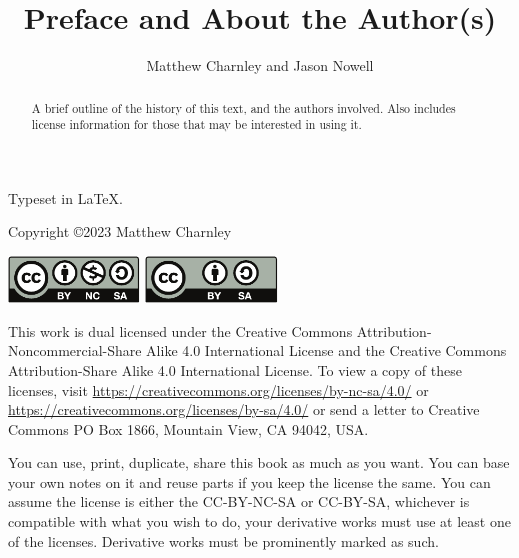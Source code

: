 \documentclass{ximera}
\title{Preface and About the Author(s)}
\author{Matthew Charnley and Jason Nowell}
\begin{document}
\begin{abstract}
    A brief outline of the history of this text, and the authors involved. Also includes license information for those that may be interested in using it.
\end{abstract}
\maketitle
\begin{small}
    \noindent
    Typeset in \LaTeX.
    
    \noindent
    Copyright \copyright 2023 Matthew Charnley
    
    
    
    \noindent
    \includegraphics[width=1.38in]{./figures/license.pdf}
    \quad
    \includegraphics[width=1.38in]{./figures/license2.pdf}
    
    \noindent
    This work
    is dual licensed under the Creative Commons Attribution-Non\-commercial-Share Alike 4.0 International License and the Creative Commons Attribution-Share Alike 4.0 International License. To view a copy of these licenses, visit \url{https://creativecommons.org/licenses/by-nc-sa/4.0/} or \url{https://creativecommons.org/licenses/by-sa/4.0/} or send a letter to Creative Commons PO Box 1866, Mountain View, CA 94042, USA\@.
    
    \noindent
    You can use, print, duplicate, share this book as much as you want.  You can base your own notes on it and reuse parts if you keep the license the same.  You can assume the license is either the CC-BY-NC-SA or CC-BY-SA\@, whichever is compatible with what you wish to do, your derivative works must use at least one of the licenses. Derivative works must be prominently marked as such.
    

\end{small}
\end{document}
